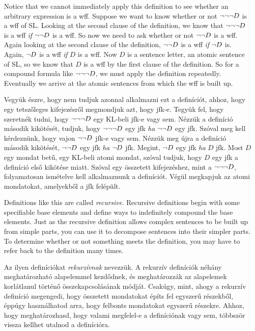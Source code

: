 Notice that we cannot immediately apply this definition to see whether an arbitrary expression is a wff. Suppose we want to know whether or not $\neg \neg \neg D$ is a wff of SL. Looking at the second clause of the definition, we know that $\neg \neg \neg D$ is a wff \emph{if} $\neg \neg D$ is a wff. So now we need to ask whether or not $\neg \neg D$ is a wff. Again looking at the second clause of the definition, $\neg \neg D$ is a wff \emph{if} $\neg D$ is. Again, $\neg D$ is a wff \emph{if} $D$ is a wff. Now $D$ is a sentence letter, an atomic sentence of SL, so we know that $D$ is a wff by the first clause of the definition. So for a compound formula like $\neg \neg \neg D$, we must apply the definition repeatedly. Eventually we arrive at the atomic sentences from which the wff is built up.

Vegyük észre, hogy nem tudjuk azonnal alkalmazni ezt a definíciót, ahhoz, hogy egy tetszőleges kifejezésről megmondjuk azt, hogy jfk-e. Tegyük fel, hogy szeretnék tudni, hogy $\neg \neg \neg D$ egy KL-beli jfk-e vagy sem. Nézzük a definíció második kikötését, tudjuk, hogy $\neg \neg \neg D$ egy jfk \emph{ha} $\neg \neg D$ egy jfk. Szóval meg kell kérdeznünk, hogy vajon $\neg \neg D$ jfk-e vagy sem. Nézzük meg újra a definíció második kikötését, $\neg \neg D$ egy jfk \emph{ha} $\neg D$ jfk. Megint, $\neg D$ egy jfk \emph{ha} $D$ jfk. Most $D$ egy mondat betű, egy KL-beli atomi mondat, szóval tudjuk, hogy $D$ egy jfk a definíció első kikötése miatt. Szóval egy összetett kifejezéshez, mint a $\neg \neg \neg D$, folyamatosan ismételve kell alkalmaznunk a definíciót. Végül megkapjuk az atomi mondatokat, amelyekből a jfk felépült.

Definitions like this are called \emph{recursive}. Recursive definitions begin with some specifiable base elements and define ways to indefinitely compound the base elements. Just as the recursive definition allows complex sentences to be built up from simple parts, you can use it to decompose sentences into their simpler parts. To determine whether or not something meets the definition, you may have to refer back to the definition many times.

Az ilyen definíciókat \emph{rekurzívnak} nevezzük. A rekurzív definíciók néhány meghatározható alapelemmel kezdődnek, és meghatározzák az alapelemek korlátlanul történő összekapcsolásának módját. Csakúgy, mint, ahogy a rekurzív definíció megengedi, hogy összetett mondatokat építs fel egyszerű részekből, éppúgy használhatod arra, hogy felbonts mondatokat egyszerű részekre. Ahhoz, hogy meghatározhasd, hogy valami megfelel-e a definíciónak vagy sem, többször vissza kellhet utalnod a definícióra.

